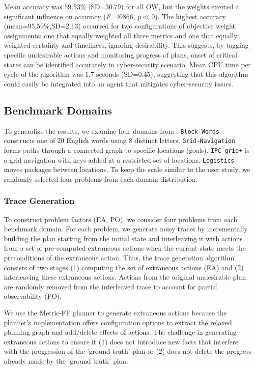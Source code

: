 Mean accuracy was 59.53\% (SD=30.79) for all OW, but the weights exerted a significant influence on accuracy (\textit{F}=40866, \textit{p}$\ll$0). 
The highest accuracy (mean=95.59\%,SD=2.13) occurred for two configurations of objective weight assignments: one that equally weighted all three metrics and one that equally weighted certainty and timeliness, ignoring desirability. 
This suggests, by tagging specific undesirable actions and monitoring progress of plans, onset of critical states can be identified accurately in cyber-security scenario. Mean CPU time per cycle of the algorithm was 1.7 seconds (SD=0.45), suggesting that this algorithm could easily be integrated into an agent that mitigates cyber-security issues.


\subsection{Benchmark Domains}
To generalize the results, we examine four domains from \cite{ramirez2009plan}. {\tt Block-Words} constructs one of 20 English words using 8 distinct letters. {\tt Grid-Navigation} forms paths through a connected graph to specific locations (goals). {\tt IPC-grid+} is a grid navigation with keys added at a restricted set of locations. {\tt Logistics} moves packages between locations. To keep the scale similar to the user study, we randomly selected four problems from each domain distribution.

\subsubsection{Trace Generation}
To construct problem factors (EA, PO), we consider four problems from each benchmark domain. 
For each problem, we generate noisy traces by incrementally building the plan starting from the initial state and interleaving it with actions from a set of pre-computed extraneous actions when the current state meets the preconditions of the extraneous action. Thus, the trace generation algorithm consists of two stages (1) computing the set of extraneous actions (EA) and (2) interleaving these extraneous actions.  Actions from the original undesirable plan are randomly removed from the interleaved trace to account for partial observability (PO).

We use the Metric-FF \cite{hoffman2003ff} planner to generate extraneous actions because the planner's implementation offers configuration options to extract the relaxed planning graph and add/delete effects of actions. The challenge in generating extraneous actions to ensure it (1) does not introduce new facts that interfere with the progression of the 'ground truth' plan  or (2) does not delete the progress already made by the 'ground truth' plan. 


